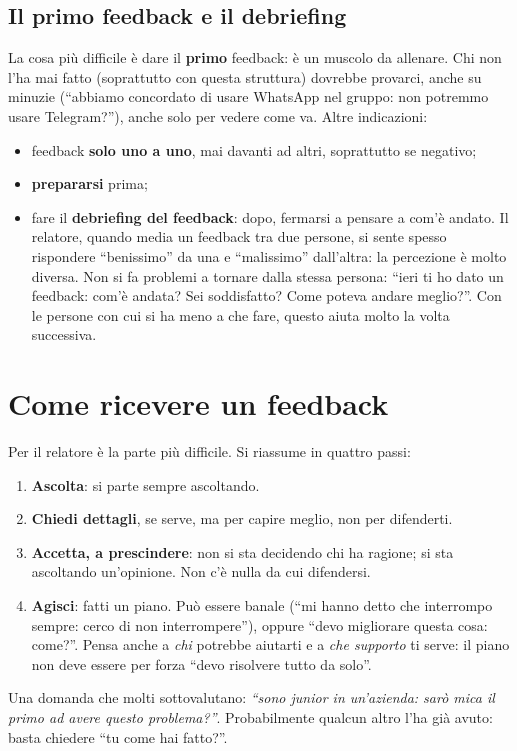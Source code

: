 \subsection{Il primo feedback e il debriefing}

La cosa più difficile è dare il \textbf{primo} feedback: è un muscolo da
allenare. Chi non l'ha mai fatto (soprattutto con questa struttura) dovrebbe
provarci, anche su minuzie (``abbiamo concordato di usare WhatsApp nel gruppo:
non potremmo usare Telegram?''), anche solo per vedere come va. Altre
indicazioni:
\begin{itemize}
  \item feedback \textbf{solo uno a uno}, mai davanti ad altri, soprattutto se
        negativo;
  \item \textbf{prepararsi} prima;
  \item fare il \textbf{debriefing del feedback}: dopo, fermarsi a pensare a
        com'è andato. Il relatore, quando media un feedback tra due persone,
        si sente spesso rispondere ``benissimo'' da una e ``malissimo''
        dall'altra: la percezione è molto diversa. Non si fa problemi a tornare
        dalla stessa persona: ``ieri ti ho dato un feedback: com'è andata? Sei
        soddisfatto? Come poteva andare meglio?''. Con le persone con cui si ha
        meno a che fare, questo aiuta molto la volta successiva.
\end{itemize}

\section{Come ricevere un feedback}
\label{sec:z1-ricevere}

Per il relatore è la parte più difficile. Si riassume in quattro passi:
\begin{enumerate}
  \item \textbf{Ascolta}: si parte sempre ascoltando.
  \item \textbf{Chiedi dettagli}, se serve, ma per capire meglio, non per
        difenderti.
  \item \textbf{Accetta, a prescindere}: non si sta decidendo chi ha ragione;
        si sta ascoltando un'opinione. Non c'è nulla da cui difendersi.
  \item \textbf{Agisci}: fatti un piano. Può essere banale (``mi hanno detto
        che interrompo sempre: cerco di non interrompere''), oppure ``devo
        migliorare questa cosa: come?''. Pensa anche a \emph{chi} potrebbe
        aiutarti e a \emph{che supporto} ti serve: il piano non deve essere
        per forza ``devo risolvere tutto da solo''.
\end{enumerate}
Una domanda che molti sottovalutano: \emph{``sono junior in un'azienda: sarò
mica il primo ad avere questo problema?''}. Probabilmente qualcun altro l'ha
già avuto: basta chiedere ``tu come hai fatto?''.

